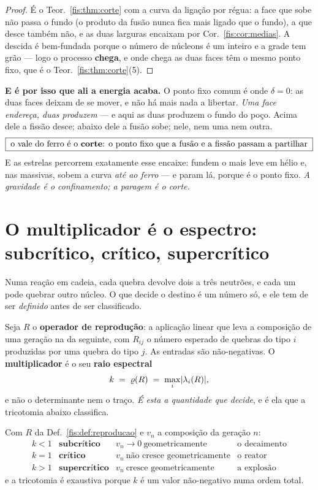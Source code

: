 \documentclass[livro.tex]{subfiles}
\begin{document}
\begin{proof}
É o Teor.~\ref{fis:thm:corte} com a curva da ligação por régua: a face que sobe
não passa o fundo (o produto da fusão nunca fica mais ligado que o fundo), a que
desce também não, e as duas larguras encaixam por
Cor.~\ref{fis:cor:medias}. A descida é bem-fundada porque o número de núcleons é
um inteiro e a grade tem grão --- logo o processo \textbf{chega}, e onde chega as
duas faces têm o mesmo ponto fixo, que é o Teor.~\ref{fis:thm:corte}(5).
\end{proof}

\medskip\noindent\textbf{E é por isso que ali a energia acaba.} O ponto fixo
comum é onde $\delta=0$: as duas faces deixam de se mover, e não há mais nada a
libertar. \emph{Uma face endereça, duas produzem} --- e aqui as duas produzem o
fundo do poço. Acima dele a fissão desce; abaixo dele a fusão sobe; nele, nem
uma nem outra.
\[
\boxed{\;\text{o vale do ferro é o \textbf{corte}: o ponto fixo que a fusão e a
fissão passam a partilhar}\;}
\]
E as estrelas percorrem exatamente esse encaixe: fundem o mais leve em hélio e,
nas massivas, sobem a curva \emph{até ao ferro} --- e param lá, porque é o ponto
fixo. \emph{A gravidade é o confinamento; a paragem é o corte.}

\section{O multiplicador é o espectro: subcrítico, crítico, supercrítico}\label{fis:kcritico}

\noindent Numa reação em cadeia, cada quebra devolve dois a três neutrões, e cada
um pode quebrar outro núcleo. O que decide o destino é um número só, e ele tem de
ser \emph{definido} antes de ser classificado.

\begin{definicao}\label{fis:def:reproducao}
Seja $R$ o \textbf{operador de reprodução}: a aplicação linear que leva a
composição de uma geração na da seguinte, com $R_{ij}$ o número esperado de
quebras do tipo $i$ produzidas por uma quebra do tipo $j$. As entradas são
não-negativas. O \textbf{multiplicador} é o seu \textbf{raio espectral}
\[
k \;=\; \varrho(R)\;=\;\max_i\lvert \lambda_i(R)\rvert ,
\]
e não o determinante nem o traço. \emph{É esta a quantidade que decide}, e é ela
que a tricotomia abaixo classifica.
\end{definicao}

\begin{teorema}\label{fis:thm:kappa}
Com $R$ da Def.~\ref{fis:def:reproducao} e $v_n$ a composição da geração $n$:
\[
\begin{array}{llll}
k<1 & \textbf{subcrítico} & v_n\to0\ \text{geometricamente} & \text{o decaimento}\\[2pt]
k=1 & \textbf{crítico} & v_n\ \text{não cresce geometricamente} & \text{o reator}\\[2pt]k>1 & \textbf{supercrítico} & v_n\ \text{cresce geometricamente} & \text{a explosão}
\end{array}
\]
e a tricotomia é exaustiva porque $k$ é um valor não-negativo numa ordem total.\end{teorema}
\end{document}
